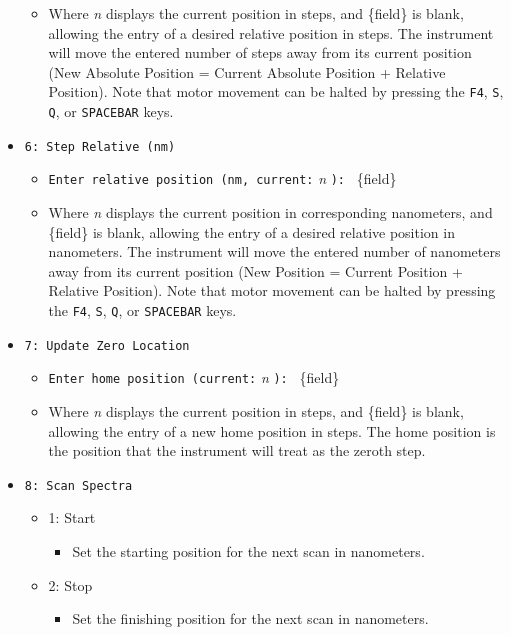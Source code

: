 \documentclass{article}
\begin{document}
\begin{itemize}
\begin{itemize}
        \item Where \emph{n} displays the current position in steps, and \{field\} is blank, allowing the entry of a desired relative position in steps. The instrument will move the entered number of steps away from its current position (New Absolute Position = Current Absolute Position + Relative Position). Note that motor movement can be halted by pressing the \verb|F4|, \verb|S|, \verb|Q|, or \verb|SPACEBAR| keys.
    \end{itemize}
    \item \verb|6: Step Relative (nm)|
    \begin{itemize}
        \item \verb|Enter relative position (nm, current:| \emph{n} \verb|): | \{field\}
        \item Where \emph{n} displays the current position in corresponding nanometers, and \{field\} is blank, allowing the entry of a desired relative position in nanometers. The instrument will move the entered number of nanometers away from its current position (New Position = Current Position + Relative Position). Note that motor movement can be halted by pressing the \verb|F4|, \verb|S|, \verb|Q|, or \verb|SPACEBAR| keys.
    \end{itemize}
    \item \verb|7: Update Zero Location|
    \begin{itemize}
        \item \verb|Enter home position (current:| \emph{n} \verb|): | \{field\}
        \item Where \emph{n} displays the current position in steps, and \{field\} is blank, allowing the entry of a new home position in steps. The home position is the position that the instrument will treat as the zeroth step.
    \end{itemize}
    \item \verb|8: Scan Spectra|
    \begin{itemize}
        \item 1: Start
        \begin{itemize}
            \item Set the starting position for the next scan in nanometers.
        \end{itemize}
        \item 2: Stop
        \begin{itemize}
            \item Set the finishing position for the next scan in nanometers.
        \end{itemize}

\end{itemize}
\end{itemize}
\end{document}
